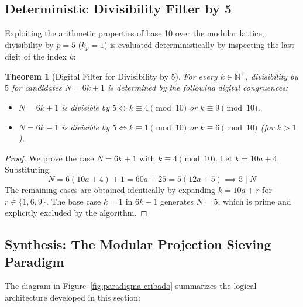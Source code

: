\documentclass{article}
\numberwithin{equation}{section}
\theoremstyle{plain}
\newtheorem{theorem}{Theorem}[section]
\theoremstyle{definition}
\begin{document}
\subsection{Deterministic Divisibility Filter by 5}
\label{sec:filtro-determinista}

Exploiting the arithmetic properties of base 10 over the modular lattice, divisibility by $p=5$ ($k_p=1$) is evaluated deterministically by inspecting the last digit of the index $k$:

\begin{theorem}[Digital Filter for Divisibility by 5]
\label{thm:filtro-5}
For every $k \in \mathbb{N}^+$, divisibility by $5$ for candidates $N = 6k \pm 1$ is determined by the following digital congruences:
\begin{itemize}
    \item $N = 6k + 1$ is divisible by $5 \iff k \equiv 4 \pmod{10}$ or $k \equiv 9 \pmod{10}$.
    \item $N = 6k - 1$ is divisible by $5 \iff k \equiv 1 \pmod{10}$ or $k \equiv 6 \pmod{10}$ (for $k > 1$).
\end{itemize}
\end{theorem}

\begin{proof}
We prove the case $N = 6k + 1$ with $k \equiv 4 \pmod{10}$. Let $k = 10a + 4$. Substituting:
\begin{equation}
N = 6(10a + 4) + 1 = 60a + 25 = 5(12a + 5) \implies 5 \mid N
\end{equation}
The remaining cases are obtained identically by expanding $k = 10a + r$ for $r \in \{1, 6, 9\}$. The base case $k=1$ in $6k-1$ generates $N=5$, which is prime and explicitly excluded by the algorithm.
\end{proof}

\subsection{Synthesis: The Modular Projection Sieving Paradigm}

The diagram in Figure~\ref{fig:paradigma-cribado} summarizes the logical architecture developed in this section:
\end{document}
